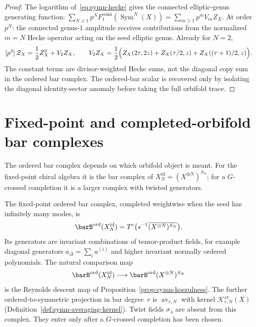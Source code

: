 \begin{proof}
The logarithm of~\eqref{eq:symn-hecke} gives the connected
elliptic-genus generating function:
$\sum_{N \geq 1} p^N F_1^{\mathrm{conn}}
(\operatorname{Sym}^N(X))
= \sum_{m \geq 1} p^m V_m Z_X$.
At order $p^N$: the connected genus-$1$ amplitude receives
contributions from the normalized $m = N$ Hecke operator acting on
the seed elliptic genus. Already for $N=2$,
\[
 [p^2]\,\mathcal Z_X
 =
 \frac{1}{2}Z_X^2 + V_2Z_X,
 \qquad
 V_2Z_X
 =
 \frac{1}{2}\Bigl(
 Z_X(2\tau,2z)
 +Z_X(\tau/2,z)
 +Z_X((\tau+1)/2,z)
 \Bigr).
\]
The constant terms are divisor-weighted Hecke sums, not the
diagonal copy sum in the ordered bar complex. The ordered-bar
scalar is recovered only by isolating the diagonal identity-sector
anomaly before taking the full orbifold trace.
\end{proof}



\section{Fixed-point and completed-orbifold bar complexes}
\label{sec:symn-bar-complex}

The ordered bar complex depends on which orbifold object is meant.
For the fixed-point chiral algebra it is the bar complex of
$X_N^{\mathrm{id}}=(X^{\otimes N})^{S_N}$; for a $G$-crossed
completion it is a larger complex with twisted generators.

\begin{computation}
\label{comp:symn-bar-decomposition}
The fixed-point ordered bar complex, completed weightwise when the
seed has infinitely many modes, is
\[
 \barB^{\mathrm{ord}}(X_N^{\mathrm{id}})
 =
 T^c\bigl(s^{-1}\overline{(X^{\otimes N})^{S_N}}\bigr).
\]
Its generators are invariant combinations of tensor-product fields,
for example diagonal generators
$a_\Delta=\sum_i a^{(i)}$ and higher invariant normally ordered
polynomials. The natural comparison map
\[
 \barB^{\mathrm{ord}}(X_N^{\mathrm{id}})
 \longrightarrow
 \barB^{\mathrm{ord}}(X^{\otimes N})^{S_N}
\]
is the Reynolds descent map of
Proposition~\ref{prop:symn-koszulness}. The further ordered-to-symmetric
projection in bar degree~$r$ is
$\operatorname{av}_{r,N}$ with kernel
$\mathcal K^{\mathrm{av}}_{r,N}(X)$
\textup{(}Definition~\ref{def:symn-averaging-kernel}\textup{)}.
Twist fields $\sigma_\lambda$ are absent from this complex. They
enter only after a $G$-crossed completion has been chosen.
\end{computation}

